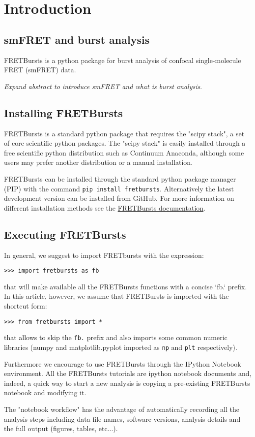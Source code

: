 \section{Introduction}

\subsection{smFRET and burst analysis}

FRETBursts is a python package for burst analysis of confocal single-molecule FRET 
(smFRET) data.

\textit{Expand abstract to introduce smFRET and what is burst analysis}.

\subsection{Installing FRETBursts}
FRETBursts is a standard python package that requires the "scipy stack", a set of core 
scientific python packages.
The "scipy stack" is easily installed through a free scientific python distribution such as Continuum Anaconda, although some users may prefer another distribution or a manual installation.

FRETBursts can be installed through the standard python package manager (PIP) with 
the command \texttt{pip install fretbursts}. Alternatively the latest development version can be installed from GitHub.
For more information on different installation methods see the \href{http://fretbursts.readthedocs.org/en/latest/installation.html}{FRETBursts documentation}.

\subsection{Executing FRETBursts}
In general, we suggest to import FRETbursts with the expression:

\begin{verbatim}
>>> import fretbursts as fb
\end{verbatim}

that will make available all the FRETBursts functions with a concise `fb.` prefix. In this article, however, we assume that FRETBursts is imported with the shortcut form:

\begin{verbatim}
>>> from fretbursts import *
\end{verbatim}

that allows to skip the \verb|fb.| prefix and also imports some common numeric libraries (numpy and matplotlib.pyplot imported as \verb|np| and \verb|plt| respectively).

Furthermore we encourage to use FRETBursts through the IPython Notebook environment. All the FRETBursts tutorials are ipython notebook documents and, indeed, a quick way to start a new analysis is copying a pre-existing FRETBursts notebook and modifying it.

The "notebook workflow"\cite{Shen_2014} has the advantage of automatically recording all the analysis steps including
data file names, software versions, analysis details and the full output (figures, tables, etc...).


